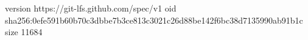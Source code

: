 version https://git-lfs.github.com/spec/v1
oid sha256:0efe591b60b70c3dbbe7b3ce813c3021c26d88be142f6bc38d7135990ab91b1c
size 11684
